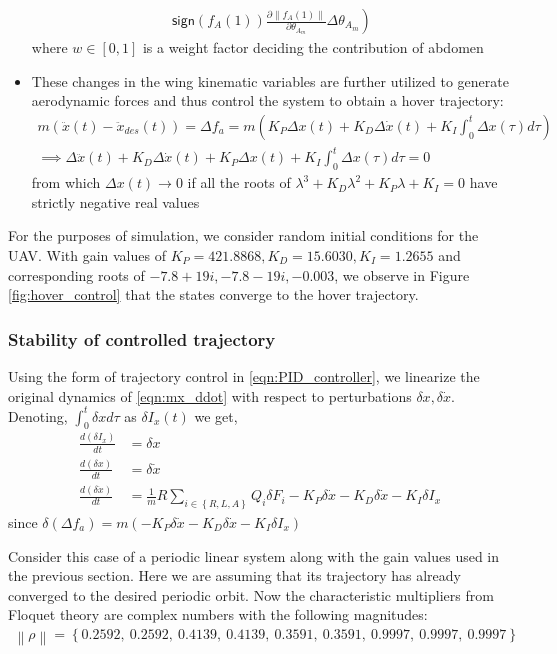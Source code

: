 \documentclass[10pt]{article}
\newcommand{\norm}[1]{\ensuremath{\left\| #1 \right\|}}
\newcommand{\braces}[1]{\ensuremath{\left\{ #1 \right\}}}
\newcommand{\sign}[1]{\ensuremath{\mathsf{sign} \left( #1 \right)}}
\begin{document}
\begin{itemize}
\begin{gather*}
		\left. \sign{f_A(1)} \frac{\partial \norm{f_A(1)}}{\partial \theta_{A_m}} \Delta \theta_{A_m} \right)
	\end{gather*}
	where $ w \in [0, 1] $ is a weight factor deciding the contribution of abdomen
	\item These changes in the wing kinematic variables are further utilized to generate aerodynamic forces and thus control the system to obtain a hover trajectory:
	\begin{gather*}
		m (\ddot{x}(t) - \ddot{x}_{des}(t)) = \Delta f_a = m (K_P \Delta x (t) + K_D \Delta\dot x(t) + K_I \int_{0}^{t} \Delta x(\tau) d\tau) \\
		\implies \Delta \ddot{x}(t) + K_D \Delta\dot x(t) + K_P \Delta x (t) + K_I \int_{0}^{t} \Delta x(\tau) d\tau = 0
	\end{gather*}
	from which $ \Delta x(t) \to 0 $ if all the roots of $ \lambda^3 + K_D \lambda^2 + K_P \lambda + K_I = 0 $ have strictly negative real values
\end{itemize}
%
For the purposes of simulation, we consider random initial conditions for the UAV. With gain values of $ K_P = 421.8868, K_D = 15.6030, K_I = 1.2655 $ and corresponding roots of $ -7.8 + 19i, -7.8 - 19i, -0.003 $, we observe in Figure \ref{fig:hover_control} that the states converge to the hover trajectory.

\subsubsection{Stability of controlled trajectory}
Using the form of trajectory control in \eqref{eqn:PID_controller}, we linearize the original dynamics of \eqref{eqn:mx_ddot} with respect to perturbations $ \delta x, \delta \dot{x} $. Denoting, $ \int_0^{t} \delta x d \tau $ as $ \delta I_x(t) $ we get,
\begin{equation}\label{eqn:pos_vel_cont_pert}
\begin{aligned}
	\frac{d (\delta I_x)}{dt} &= \delta x \\
	\frac{d (\delta x)}{dt} &= \delta \dot{x} \\
	\frac{d (\delta \dot{x})}{dt} &= \frac{1}{m} R \sum_{i\in \braces{R, L, A}}Q_i \delta F_i - K_P \delta \dot{x} - K_D \delta \dot{x} - K_I \delta I_x
\end{aligned}
\end{equation}
since $ \delta (\Delta f_a) = m(-K_P \delta \dot{x} - K_D \delta \dot{x} - K_I \delta I_x) $

Consider this case of a periodic linear system along with the gain values used in the previous section. Here we are assuming that its trajectory has already converged to the desired periodic orbit. Now the characteristic multipliers from Floquet theory are complex numbers with the following magnitudes:
\begin{gather*}
	\norm{\rho} = \braces{0.2592,\ 0.2592,\	0.4139,\ 0.4139,\ 0.3591,\ 0.3591,\	0.9997,\ 0.9997,\ 0.9997}
\end{gather*}
\end{document}
